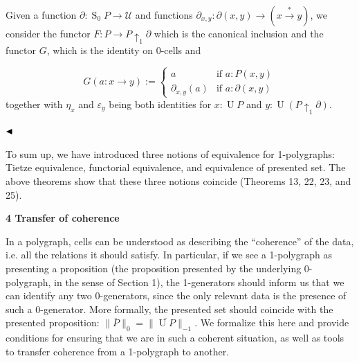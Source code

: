 \documentclass[10pt,a4paper]{amsart}
\begin{document}
Given a function $\partial:\operatorname{S}_{0}P\to\mathcal{U}$ and functions $\partial_{x,y}:\partial(x,y)\to(x\overset{*}{\to}y)$, we consider the functor $F:P\to P{\uparrow_{1}}\partial$ which is the canonical inclusion and the functor $G$, which is the identity on 0-cells and\par
    \[G(a:x\to y):=\begin{cases}a&\text{if $a:P(x,y)$}\\
\partial_{x,y}(a)&\text{if $a:\partial(x,y)$}\end{cases}\]    
together with $\eta_{x}$ and $\varepsilon_{y}$ being both identities for $x:\operatorname{U}P$ and $y:\operatorname{U}(P{\uparrow_{1}}\partial)$.\par
 
   
$\hfill\blacktriangleleft$\par
 
 
 
To sum up, we have introduced three notions of equivalence for 1-polygraphs: Tietze equivalence, functorial equivalence, and equivalence of presented set. The above theorems show that these three notions coincide (Theorems 13, 22, 23, and 25).\par
 
 
 
 


 
\par\medskip\noindent\textbf{4 Transfer of coherence}\par
 
 
In a polygraph, cells can be understood as describing the “coherence” of the data, i.e. all the relations it should satisfy. In particular, if we see a 1-polygraph as presenting a proposition (the proposition presented by the underlying 0-polygraph, in the sense of Section 1), the 1-generators should inform us that we can identify any two 0-generators, since the only relevant data is the presence of such a 0-generator. More formally, the presented set should coincide with the presented proposition: $\|\overline{P}\|_{0}=\|\overline{\operatorname{U}P}\|_{-1}$. We formalize this here and provide conditions for ensuring that we are in such a coherent situation, as well as tools to transfer coherence from a 1-polygraph to another.\par
 
\end{document}
